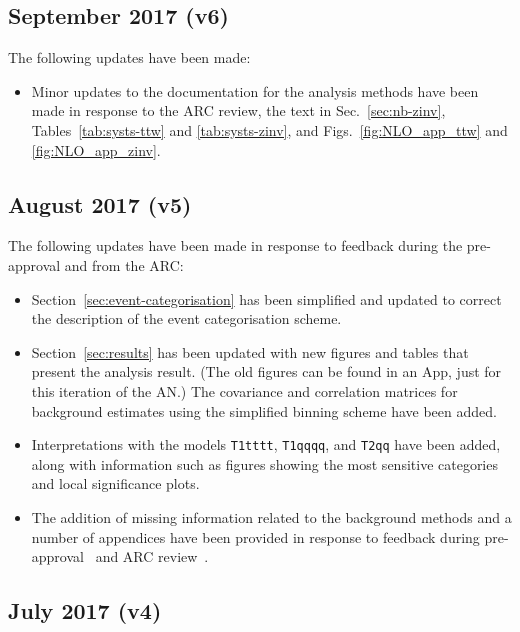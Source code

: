 \subsection{September 2017 (v6)}

The following updates have been made:
\begin{itemize}
\item Minor updates to the documentation for the analysis methods have
  been made in response to the ARC review, \eg the text in
  Sec.~\ref{sec:nb-zinv}, Tables~\ref{tab:systs-ttw} and
  \ref{tab:systs-zinv}, and Figs.~\ref{fig:NLO_app_ttw} and
  \ref{fig:NLO_app_zinv}. 
\end{itemize}

\subsection{August 2017 (v5)}

The following updates have been made in response to feedback during
the pre-approval and from the ARC:
\begin{itemize}
\item Section~\ref{sec:event-categorisation} has been simplified and
  updated to correct the description of the event categorisation
  scheme.
\item Section~\ref{sec:results} has been updated with new figures and
  tables that present the analysis result. (The old figures can be
  found in an App, just for this iteration of the
  AN.)  The covariance and correlation matrices for background
  estimates using the simplified binning scheme have been added.
\item Interpretations with the models \verb!T1tttt!, \verb!T1qqqq!,
  and \verb!T2qq!  have been added, along with information such as
  figures showing the most sensitive categories and local significance
  plots.
\item The addition of missing information related to the background
  methods and a number of appendices have been provided in response to
  feedback during pre-approval~\cite{preapp} and ARC
  review~\cite{arcreviewowen, arcreviewnadja}. 
\end{itemize}

\subsection{July 2017 (v4)}


